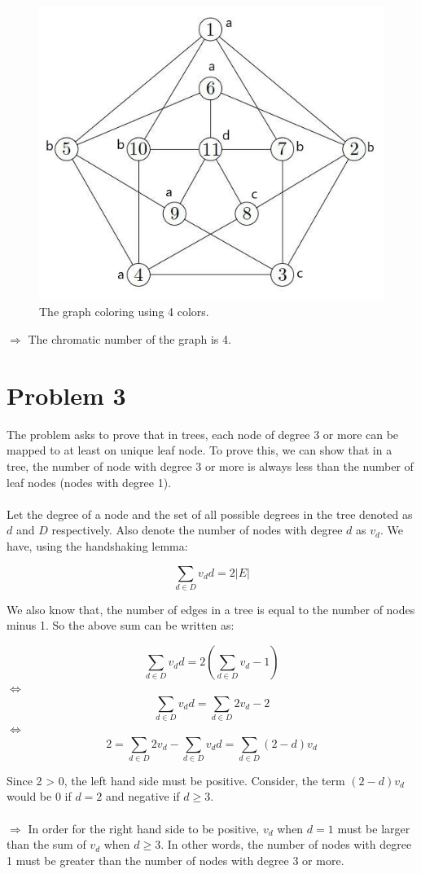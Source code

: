 \documentclass{article}
\begin{document}
\begin{figure}[h]
    \includegraphics[scale = 0.53]{2.3}
    \centering
    \caption{The graph coloring using 4 colors.}
\end{figure}

$\Longrightarrow$ The chromatic number of the graph is 4.
\pagebreak


\section*{Problem 3}
The problem asks to prove that in trees, each node of degree 3 or more can be mapped to at least on unique leaf node. To prove this, we can show that in a tree, the number of node with degree 3 or more is always less than the number of leaf nodes (nodes with degree 1).  \\\\
Let the degree of a node and the set of all possible degrees in the tree denoted as ${d}$ and ${D}$ respectively. Also denote the number of nodes with degree ${d}$ as ${v_d}$. We have, using the handshaking lemma: 

\[ \sum_{d \in D} {v_d}  {d} = 2|{E}|\] 

We also know that, the number of edges in a tree is equal to the number of nodes minus 1. So the above sum can be written as:

\[ \sum_{d \in D} {v_d}  {d} = 2(\sum_{d \in D} {v_d} - 1)\]
$\Leftrightarrow$ 
\[\sum_{d \in D} {v_d}  {d} = \sum_{d \in D} {2v_d} - 2\]
$\Leftrightarrow$ 
\[ 2 = \sum_{d \in D} {2v_d} - \sum_{d \in D} {v_d}  {d} = \sum_{d \in D} {(2 - d)v_d}\]

Since 2 > 0, the left hand side must be positive. Consider, the term ${(2 - d)v_d}$ would be 0 if ${d = 2}$ and negative if ${d \geq 3}$. \\\\
$\Rightarrow$ In order for the right hand side to be positive, ${v_d}$ when ${d = 1}$ must be larger than the sum of ${v_d}$ when ${d \geq 3}$. In other words, the number of nodes with degree 1 must be greater than the number of nodes with degree 3 or more.
\end{document}
